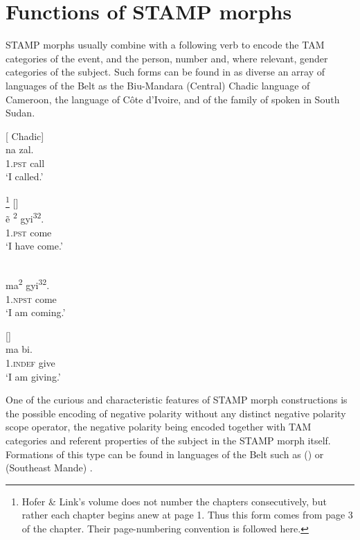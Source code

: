 \documentclass[output=paper]{langsci/langscibook}
\begin{document}
                  
 


\section{Functions of STAMP morphs}\label{sec:Anderson:3}

STAMP morphs usually combine with a following verb to encode the TAM categories of the event, and the person, number and, where relevant, gender categories of the subject. Such forms can be found in as diverse an array of languages of the  Belt as the  {Biu-Mandara (Central) Chadic} language   of Cameroon, the  language   of Côte d'Ivoire, and  of the  family of   spoken in South Sudan.

\ea\label{ex:anderson:3}
  \citep[8]{Gravina2007}                 [ Chadic]\\
\gll na  zal.    \\
\textsc{1.pst}  call   \\
\glt `I called.'  
\z

 \newpage
\ea\label{ex:anderson:4}
\ea\label{ex:anderson:4a}
 \citep[ 3]{HoferLink1973}\footnote{Hofer \& Link's volume does not number the chapters consecutively, but rather each chapter begins anew at page 1. Thus this form comes from page 3 of the  chapter. Their page-numbering convention is followed here.}    []\\
\gll ẽ\textsuperscript{ 2}    gyi\textsuperscript{32}.            \\
1.\textsc{pst}  come  \\
\glt `I have come.'    
 

\ex \label{ex:anderson:4b}
\\
\gll  ma\textsuperscript{2}  gyi\textsuperscript{32}.\\
1.\textsc{npst}  come\\
\glt `I am coming.'  
\z
\z

\ea\label{ex:anderson:5}
   \citep[75]{TuckerBryan1966}       []\\
\gll ma    bi.\\
1.\textsc{indef}  give  \\
\glt `I am giving.'
\z

One of the curious and characteristic features of STAMP morph constructions is the possible encoding of negative polarity without any distinct negative polarity scope operator, the negative polarity being encoded together with TAM categories and referent properties of the subject in the STAMP morph itself. Formations of this type can be found in languages of the  Belt such as  ()  or  (Southeast Mande) . 
\end{document}
